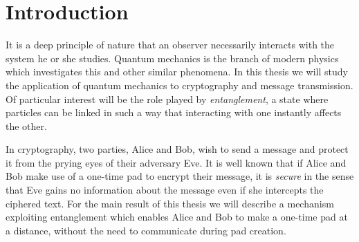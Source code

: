 
\chapter{Introduction} %

\label{Chapter1-introduction} %


\newcommand{\keyword}[1]{\textbf{#1}}
\newcommand{\tabhead}[1]{\textbf{#1}}
\newcommand{\code}[1]{\texttt{#1}}
\newcommand{\file}[1]{\texttt{\bfseries#1}}
\newcommand{\option}[1]{\texttt{\itshape#1}}

It is a deep principle of nature that an observer necessarily interacts with the system he or she studies. Quantum mechanics is the branch of modern physics which investigates this and other similar phenomena. In this thesis we will study the application of quantum mechanics to cryptography and message transmission. Of particular interest will be the role played by {\emph{entanglement}}, a state where particles can be linked in such a way that interacting with one instantly affects the other. 

In cryptography, two parties, Alice and Bob, wish to send a message and protect it from the prying eyes of their adversary Eve. It is well known that if Alice and Bob make use of a one-time pad to encrypt their message, it is \emph{secure} in the sense that Eve gains no information about the message even if she intercepts the ciphered text. For the main result of this thesis we will describe a mechanism exploiting entanglement which enables Alice and Bob to make a one-time pad at a distance, without the need to communicate during pad creation. 

